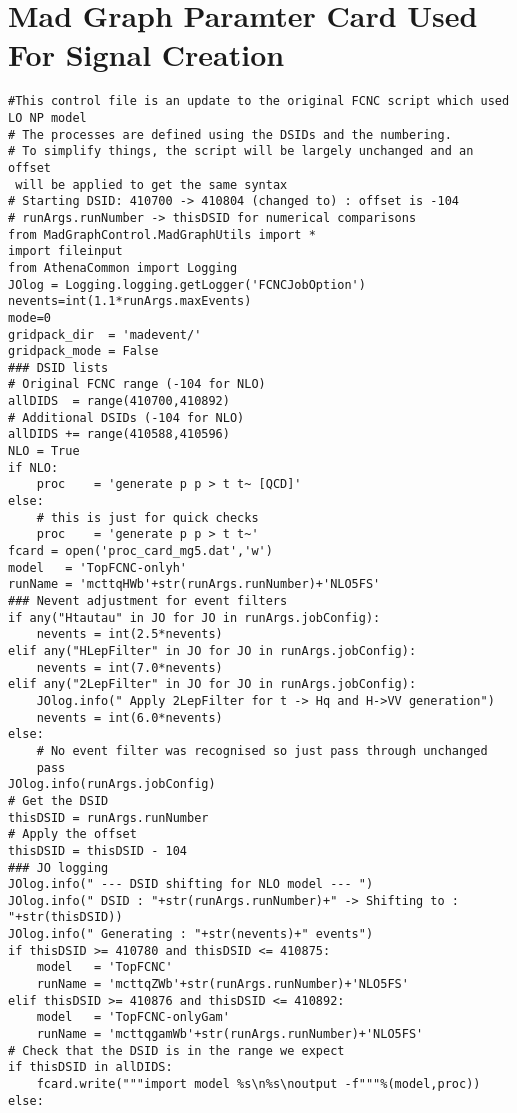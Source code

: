 \chapter{Mad Graph Paramter Card Used For Signal Creation}
\label{sec:MGParamCard}

\begin{tiny}
\begin{verbatim}
#This control file is an update to the original FCNC script which used LO NP model
# The processes are defined using the DSIDs and the numbering.
# To simplify things, the script will be largely unchanged and an offset
 will be applied to get the same syntax
# Starting DSID: 410700 -> 410804 (changed to) : offset is -104
# runArgs.runNumber -> thisDSID for numerical comparisons
from MadGraphControl.MadGraphUtils import *
import fileinput
from AthenaCommon import Logging
JOlog = Logging.logging.getLogger('FCNCJobOption')
nevents=int(1.1*runArgs.maxEvents)
mode=0
gridpack_dir  = 'madevent/'
gridpack_mode = False
### DSID lists
# Original FCNC range (-104 for NLO)
allDIDS  = range(410700,410892)
# Additional DSIDs (-104 for NLO)
allDIDS += range(410588,410596)
NLO = True
if NLO:
    proc    = 'generate p p > t t~ [QCD]'
else:
    # this is just for quick checks
    proc    = 'generate p p > t t~'
fcard = open('proc_card_mg5.dat','w')
model   = 'TopFCNC-onlyh'
runName = 'mcttqHWb'+str(runArgs.runNumber)+'NLO5FS'
### Nevent adjustment for event filters
if any("Htautau" in JO for JO in runArgs.jobConfig):
    nevents = int(2.5*nevents)
elif any("HLepFilter" in JO for JO in runArgs.jobConfig):
    nevents = int(7.0*nevents)
elif any("2LepFilter" in JO for JO in runArgs.jobConfig):
    JOlog.info(" Apply 2LepFilter for t -> Hq and H->VV generation")
    nevents = int(6.0*nevents)
else:
    # No event filter was recognised so just pass through unchanged
    pass
JOlog.info(runArgs.jobConfig)
# Get the DSID
thisDSID = runArgs.runNumber
# Apply the offset
thisDSID = thisDSID - 104
### JO logging
JOlog.info(" --- DSID shifting for NLO model --- ")
JOlog.info(" DSID : "+str(runArgs.runNumber)+" -> Shifting to : "+str(thisDSID))
JOlog.info(" Generating : "+str(nevents)+" events")
if thisDSID >= 410780 and thisDSID <= 410875:
    model   = 'TopFCNC'
    runName = 'mcttqZWb'+str(runArgs.runNumber)+'NLO5FS'
elif thisDSID >= 410876 and thisDSID <= 410892:
    model   = 'TopFCNC-onlyGam'
    runName = 'mcttqgamWb'+str(runArgs.runNumber)+'NLO5FS'
# Check that the DSID is in the range we expect
if thisDSID in allDIDS:
    fcard.write("""import model %s\n%s\noutput -f"""%(model,proc))
else:

\end{verbatim}
\end{tiny}
